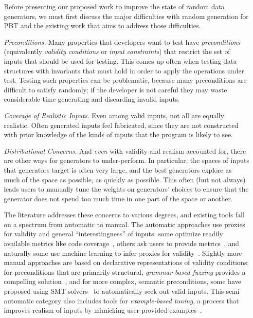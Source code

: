 %
Before presenting our proposed work to improve the state of random data
generators, we must first discuss the major difficulties with random generation
for PBT and the existing work that aims to address those difficulties.


{\em Preconditions.}
Many properties that developers want to test have {\em preconditions}
(equivalently {\em validity conditions} or {\em input constraints}) that
restrict the set of inputs that should be used for testing. This comes up often
when testing data structures with invariants that must hold in order to apply
the operations under test. Testing such properties can be problematic, because
many preconditions are difficult to satisfy randomly; if the developer is not
careful they may waste considerable time generating and discarding invalid inputs.

{\em Coverage of Realistic Inputs.}
Even among valid inputs, not all are equally realistic. Often generated inputs
feel fabricated, since they are not constructed with prior knowledge of the
kinds of inputs that the program is likely to see.

{\em Distributional Concerns.}
And {\em even} with validity and realism accounted for, there are other ways for
generators to under-perform. In particular, the spaces of inputs that generators
target is often very large, and the best generators explore as much of the space
as possible, as quickly as possible. This often (but not always) leads users to manually tune
the weights on generators' choices to ensure that the generator does not spend
too much time in one part of the space or another.


The literature addresses these concerns to various degrees, and existing tools
fall on a spectrum from automatic to manual. The automatic approaches use
proxies for validity and general ``interestingness'' of inputs: some optimize
readily available metrics like code coverage~\cite{afl-readme}, others ask users
to provide metrics~\cite{loscher2017targetedpbt}, and naturally some use
machine learning to infer proxies for validity~\cite{godefroid2017learn,
DBLP:conf/icse/ReddyLPS20}. Slightly more manual approaches are based on
declarative representations of validity conditions: for preconditions that are
primarily structural, {\em grammar-based fuzzing} provides a compelling
solution~\cite{godefroid2008grammar, holler2012fuzzing, veggalam2016ifuzzer,
wang2019superion, srivastava2021gramatron}, and for more complex, semantic
preconditions, some have proposed using SMT-solvers~\cite{dewey2017automated, LuckPOPL, steinhofel2022input} to
automatically seek out valid inputs. This semi-automatic category also includes
tools for {\em example-based tuning}, a process that improves realism of inputs
by mimicking user-provided examples~\cite{soremekun2020inputs}.

